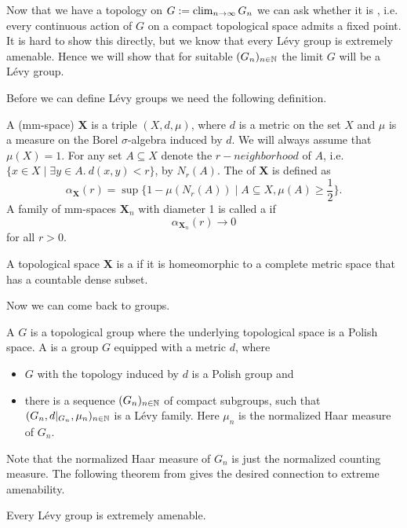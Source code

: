 Now that we have a topology on $G:=\operatorname{clim}\limits_{n\to\infty} G_n$ we can ask whether it is , i.e. every continuous action of $G$ on a compact topological space admits a fixed point. It is hard to show this directly, but we know that every L\'evy group is extremely amenable. Hence we will show that for suitable $(G_n)_{n\in\mathbb{N}}$ the limit $G$ will be a L\'evy group.

Before we can define L\'evy groups we need the following definition.
\begin{definition}
A  (mm-space) $\boldsymbol{X}$ is a triple $(X,d,\mu)$, where $d$ is a metric on the set $X$ and $\mu$ is a measure on the Borel $\sigma$-algebra induced by $d$. We will always assume that $\mu(X)=1$. 
For any set $A\subseteq X$ denote the $r-neighborhood$ of $A$, i.e. $\{x\in X\mid\exists y\in A.\  d(x,y)<r\}$, by $N_r(A)$.
The  of $\boldsymbol{X}$ is defined as 
\[\alpha_{\boldsymbol{X}}(r)=\sup\{1-\mu(N_r(A))\mid A\subseteq X, \mu(A)\geq\frac{1}{2}\}.\]
A family of mm-spaces $\boldsymbol{X}_n$ with diameter 1 is called a  if 
\[\alpha_{\boldsymbol{X}_n}(r)\to 0\]
for all $r>0$.

A topological space $\boldsymbol{X}$ is a  if it is homeomorphic to a complete metric space that has a countable dense subset.
\end{definition}

Now we can come back to groups.
\begin{definition}
A  $G$ is a topological group where the underlying topological space is a Polish space. A  is a group $G$ equipped with a metric $d$, where
\begin{itemize}
\item $G$ with the topology induced by $d$ is a Polish group and
\item there is a sequence $(G_n)_{n\in\mathbb{N}}$ of compact subgroups, such that $(G_n,d|_{G_n},\mu_n)_{n\in\mathbb{N}}$ is a L\'evy family. Here $\mu_n$ is the normalized Haar measure of $G_n$.
\end{itemize}  
\end{definition}
Note that the normalized Haar measure of $G_n$ is just the normalized counting measure.
The following theorem from \cite{Levy} gives the desired connection to extreme amenability.
\begin{theorem}\label{thm:LevyImpliesExAm}
Every L\'evy group is extremely amenable.
\end{theorem}

